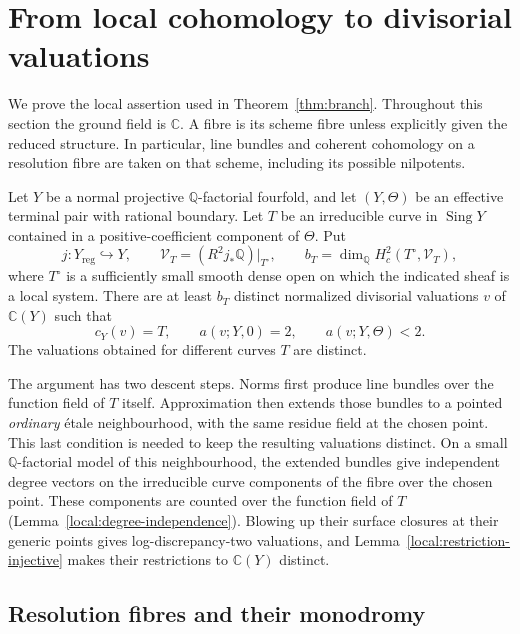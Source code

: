 \section{From local cohomology to divisorial valuations}
\label{sec:local-valuations}

We prove the local assertion used in Theorem~\ref{thm:branch}.  Throughout
this section the ground field is $\mathbb C$.  A fibre is its scheme fibre
unless explicitly given the reduced structure.  In particular, line
bundles and coherent cohomology on a resolution fibre are taken on that
scheme, including its possible nilpotents.

\begin{proposition}\label{prop:local-valuations}
Let $Y$ be a normal projective $\mathbb Q$-factorial fourfold, and let
$(Y,\Theta)$ be an effective terminal pair with rational boundary.  Let
$T$ be an irreducible curve in $\operatorname{Sing}Y$ contained in a
positive-coefficient component of $\Theta$.  Put
\[
 j:Y_{\mathrm{reg}}\hookrightarrow Y,
 \qquad
 \mathcal V_T=(R^2j_*\mathbb Q)|_{T^\circ},
 \qquad
 b_T=\dim_{\mathbb Q}H_c^2(T^\circ,\mathcal V_T),
\]
where $T^\circ$ is a sufficiently small smooth dense open on which the
indicated sheaf is a local system.  There are at least $b_T$ distinct
normalized divisorial valuations $v$ of $\mathbb C(Y)$ such that
\[
 c_Y(v)=T,\qquad a(v;Y,0)=2,\qquad a(v;Y,\Theta)<2.
\]
The valuations obtained for different curves $T$ are distinct.
\end{proposition}

The argument has two descent steps.  Norms first produce line bundles
over the function field of $T$ itself.  Approximation then extends those
bundles to a pointed \emph{ordinary} \'etale
neighbourhood, with the same residue field at the chosen point.  This
last condition is needed to keep the resulting valuations distinct.
On a small $\mathbb Q$-factorial model of this neighbourhood, the extended
bundles give independent degree vectors on the irreducible curve components
of the fibre over the chosen point.  These components are counted over the
function field of $T$ (Lemma~\ref{local:degree-independence}).
Blowing up their surface closures at their generic points gives
log-discrepancy-two valuations, and Lemma~\ref{local:restriction-injective}
makes their restrictions to $\mathbb C(Y)$ distinct.

\subsection{Resolution fibres and their monodromy}

